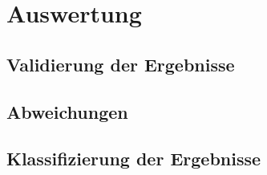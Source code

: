 \cleardoublepage
\chapter{Auswertung}

\section{Validierung der Ergebnisse}
\label{sec:validation}

\section{Abweichungen}
\label{sec:abweichung}

\section{Klassifizierung der Ergebnisse}
\label{sec:klassification}